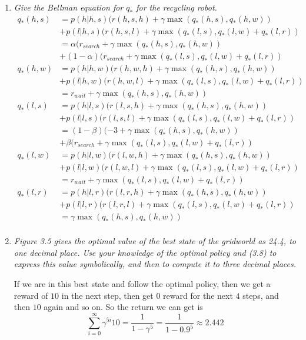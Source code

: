 \documentclass[12pt,a4paper]{article}
\begin{document}
\begin{enumerate}
\item
  \textit{Give the Bellman equation for $q_\ast$ for the recycling robot.}
  \begin{align*}
    q_\ast(h, s) &= p(h|h, s) (r(h, s, h) + \gamma \max(q_\ast(h, s), q_\ast(h, w))\\
    & + p(l|h, s) (r(h, s, l) + \gamma \max(q_\ast(l, s), q_\ast(l, w) + q_\ast(l, r))\\
    & = \alpha(r_{search} + \gamma \max(q_\ast(h, s), q_\ast(h, w))\\
    & + (1 - \alpha)(r_{search} + \gamma \max(q_\ast(l, s), q_\ast(l, w) + q_\ast(l, r))\\
    q_\ast(h, w) &= p(h|h, w) (r(h, w, h) + \gamma \max(q_\ast(h, s), q_\ast(h, w))\\
    & + p(l|h, w) (r(h, w, l) + \gamma \max(q_\ast(l, s), q_\ast(l, w) + q_\ast(l, r))\\
    & = r_{wait} + \gamma \max(q_\ast(h, s), q_\ast(h, w))\\
    q_\ast(l, s) &= p(h|l, s) (r(l, s, h) + \gamma \max(q_\ast(h, s), q_\ast(h, w))\\
    & + p(l|l, s) (r(l, s, l) + \gamma \max(q_\ast(l, s), q_\ast(l, w) + q_\ast(l, r))\\
    & = (1 - \beta)(-3 + \gamma \max(q_\ast(h, s), q_\ast(h, w))\\
    & + \beta(r_{search} + \gamma \max(q_\ast(l, s), q_\ast(l, w) + q_\ast(l, r))\\
    q_\ast(l, w) &= p(h|l, w) (r(l, w, h) + \gamma \max(q_\ast(h, s), q_\ast(h, w))\\
    & + p(l|l, w) (r(l, w, l) + \gamma \max(q_\ast(l, s), q_\ast(l, w) + q_\ast(l, r))\\
    & = r_{wait} + \gamma \max(q_\ast(l, s), q_\ast(l, w) + q_\ast(l, r))\\
    q_\ast(l, r) &= p(h|l, r) (r(l, r, h) + \gamma \max(q_\ast(h, s), q_\ast(h, w))\\
    & + p(l|l, r) (r(l, r, l) + \gamma \max(q_\ast(l, s), q_\ast(l, w) + q_\ast(l, r))\\
    & = \gamma \max(q_\ast(h, s), q_\ast(h, w))\\
  \end{align*}

\item
  \textit{Figure 3.5 gives the optimal value of the best state of the gridworld as
  24.4, to one decimal place. Use your knowledge of the optimal policy and (3.8) to express
  this value symbolically, and then to compute it to three decimal places.}

  If we are in this best state and follow the optimal policy, then we get a reward of $10$
  in the next step, then get $0$ reward for the next $4$ steps, and then $10$ again and so on.
  So the return we can get is
  \[\sum\limits_{i = 0}^{\infty} \gamma^{5i} 10 = \frac{1}{1 - \gamma^5} = \frac{1}{1 - 0.9^5} \approx 2.442\]



\end{enumerate}
\end{document}
